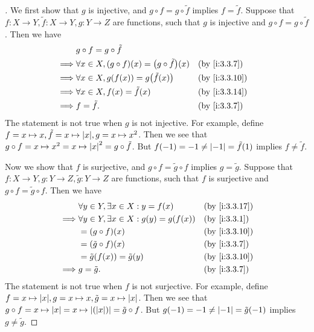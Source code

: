 \begin{proof}[]
  We first show that \(g\) is injective, and \(g \circ f = g \circ \tilde{f}\) implies \(f = \tilde{f}\).
  Suppose that \(f : X \to Y, \tilde{f} : X \to Y, g : Y \to Z\) are functions, such that \(g\) is injective and \(g \circ f = g \circ \tilde{f}\).
  Then we have
  \begin{align*}
             & g \circ f = g \circ \tilde{f}                                                  \\
    \implies & \forall x \in X, (g \circ f)(x) = \pa{g \circ \tilde{f}}(x) &  & \by{i:3.3.7}  \\
    \implies & \forall x \in X, g(f(x)) = g\pa{\tilde{f}(x)}               &  & \by{i:3.3.10} \\
    \implies & \forall x \in X, f(x) = \tilde{f}(x)                        &  & \by{i:3.3.14} \\
    \implies & f = \tilde{f}.                                              &  & \by{i:3.3.7}
  \end{align*}
  The statement is not true when \(g\) is not injective.
  For example, define \(f = x \mapsto x, \tilde{f} = x \mapsto \abs{x}, g = x \mapsto x^2\).
  Then we see that \(g \circ f = x \mapsto x^2 = x \mapsto \left\lvert x\right\rvert^2 = g \circ \tilde{f}\).
  But \(f(-1) = -1 \neq \left\lvert-1\right\rvert = \tilde{f}(1)\) implies \(f \neq \tilde{f}\).

  Now we show that \(f\) is surjective, and \(g \circ f = \tilde{g} \circ f\) implies \(g = \tilde{g}\).
  Suppose that\(f : X \to Y, g : Y \to Z, \tilde{g} : Y \to Z\) are functions, such that \(f\) is surjective and \(g \circ f = \tilde{g} \circ f\).
  Then we have
  \begin{align*}
             & \forall y \in Y, \exists x \in X : y = f(x)       &  & \by{i:3.3.17} \\
    \implies & \forall y \in Y, \exists x \in X : g(y) = g(f(x)) &  & \by{i:3.3.1}  \\
             & = (g \circ f)(x)                                  &  & \by{i:3.3.10} \\
             & = (\tilde{g} \circ f)(x)                          &  & \by{i:3.3.7}  \\
             & = \tilde{g}(f(x)) = \tilde{g}(y)                  &  & \by{i:3.3.10} \\
    \implies & g = \tilde{g}.                                    &  & \by{i:3.3.7}
  \end{align*}
  The statement is not true when \(f\) is not surjective.
  For example, define \(f = x \mapsto \abs{x}, g = x \mapsto x, \tilde{g} = x \mapsto \abs{x}\).
  Then we see that \(g \circ f = x \mapsto \left\lvert x\right\rvert = x \mapsto \left\lvert(\left\lvert x\right\rvert)\right\rvert = \tilde{g} \circ f\).
  But \(g(-1) = -1 \neq \left\lvert-1\right\rvert = \tilde{g}(-1)\) implies \(g \neq \tilde{g}\).
\end{proof}

